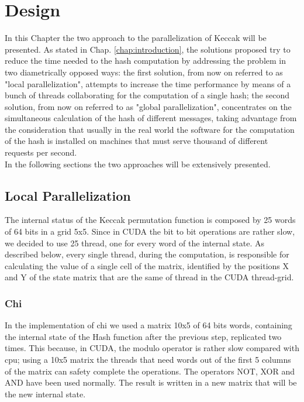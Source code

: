 \chapter{Design}\label{chap:design}
In this Chapter the two approach to the parallelization of Keccak will be presented. As stated in Chap. \ref{chap:introduction}, the solutions proposed try to reduce the time needed to the hash computation by addressing the problem in two diametrically opposed ways: the first solution, from now on referred to as "local parallelization", attempts to increase the time performance by means of a bunch of threads collaborating for the computation of a single hash; the second solution, from now on referred to as "global parallelization", concentrates on the simultaneous calculation of the hash of different messages, taking advantage from the consideration that usually in the real world the software for the computation of the hash is installed on machines that must serve thousand of different requests per second.\\
In the following sections the two approaches will be extensively presented.\\


\section{Local Parallelization}
The internal status of the Keccak permutation function is composed by 25 words of 64 bits in a grid 5x5. Since in CUDA the bit to bit operations are rather slow, we decided to use 25 thread, one for every word of the internal state. As described below, every single thread, during the computation, is responsible for calculating the value of a single cell of the matrix, identified by the positions X and Y of the state matrix that are the same of thread in the CUDA thread-grid.

\subsection{Chi}
In the implementation of chi we used a matrix 10x5 of 64 bits words, containing the internal state of the Hash function after the previous step, replicated two times. This because, in CUDA, the modulo operator is rather slow compared with cpu; using a 10x5 matrix the threads that need words out of the first 5 columns of the matrix can safety complete the operations. The operators NOT, XOR and AND have been used normally. The result is written in a new matrix that will be the new internal state.


